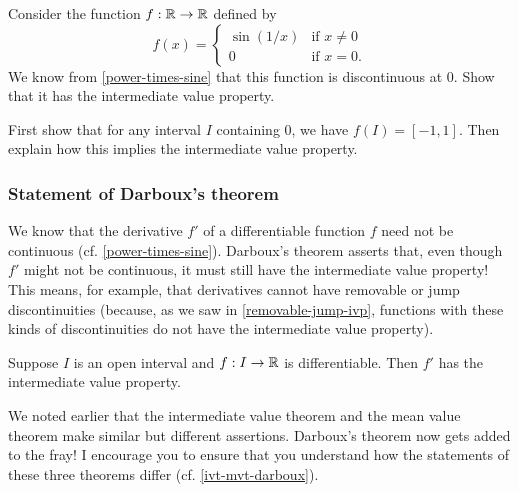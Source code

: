 \begin{exercise} \label{discontinuous-ivp}
	Consider the function $f : \mathbb{R} \to \mathbb{R}$ defined by
	\[ f(x) = \begin{cases} \sin(1/x) & \text{if } x \neq 0 \\ 0 & \text{if } x = 0. \end{cases} \]
	We know from \cref{power-times-sine} that this function is discontinuous at 0. Show that it has the intermediate value property. \begin{hint} First show that for any interval $I$ containing 0, we have $f(I) = [-1,1]$. Then explain how this implies the intermediate value property. 
	\end{hint}
\end{exercise}

\subsubsection*{Statement of Darboux's theorem}

We know that the derivative $f'$ of a differentiable function $f$ need not be continuous (cf. \cref{power-times-sine}). Darboux's theorem asserts that, even though $f'$ might not be continuous, it must still have the intermediate value property! This means, for example, that derivatives cannot have removable or jump discontinuities (because, as we saw in \cref{removable-jump-ivp}, functions with these kinds of discontinuities do not have the intermediate value property). 

\begin{theorem}[Darboux] \label{darboux} 
	Suppose $I$ is an open interval and $f : I \to \mathbb{R}$ is differentiable. Then $f'$ has the intermediate value property. 
\end{theorem}

We noted earlier that the intermediate value theorem and the mean value theorem make similar but different assertions. Darboux's theorem now gets added to the fray! I encourage you to ensure that you understand how the statements of these three theorems differ (cf. \cref{ivt-mvt-darboux}).

